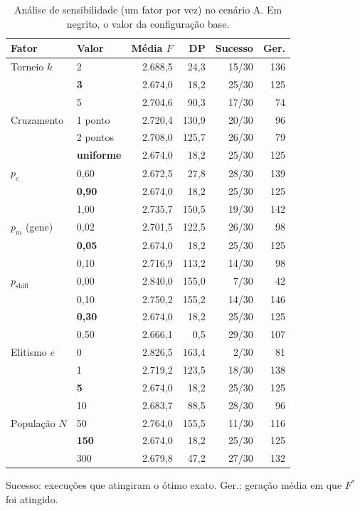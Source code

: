 \begin{table}[!t]
\centering
\footnotesize
\setlength{\tabcolsep}{4pt}
\caption{Análise de sensibilidade (um fator por vez) no cenário A. Em negrito, o valor da configuração base.}
\label{tab:a1_sens}
\begin{tabular}{@{}llrrrr@{}}
\toprule
Fator & Valor & Média $F$ & DP & Sucesso & Ger. \\
\midrule
Torneio $k$ & 2 & 2.688{,}5 & 24{,}3 & 15/30 & 136 \\
 & \textbf{3} & 2.674{,}0 & 18{,}2 & 25/30 & 125 \\
 & 5 & 2.704{,}6 & 90{,}3 & 17/30 & 74 \\
\midrule
Cruzamento & 1 ponto & 2.720{,}4 & 130{,}9 & 20/30 & 96 \\
 & 2 pontos & 2.708{,}0 & 125{,}7 & 26/30 & 79 \\
 & \textbf{uniforme} & 2.674{,}0 & 18{,}2 & 25/30 & 125 \\
\midrule
$p_c$ & 0{,}60 & 2.672{,}5 & 27{,}8 & 28/30 & 139 \\
 & \textbf{0{,}90} & 2.674{,}0 & 18{,}2 & 25/30 & 125 \\
 & 1{,}00 & 2.735{,}7 & 150{,}5 & 19/30 & 142 \\
\midrule
$p_m$ (gene) & 0{,}02 & 2.701{,}5 & 122{,}5 & 26/30 & 98 \\
 & \textbf{0{,}05} & 2.674{,}0 & 18{,}2 & 25/30 & 125 \\
 & 0{,}10 & 2.716{,}9 & 113{,}2 & 14/30 & 98 \\
\midrule
$p_{\mathrm{shift}}$ & 0{,}00 & 2.840{,}0 & 155{,}0 & 7/30 & 42 \\
 & 0{,}10 & 2.750{,}2 & 155{,}2 & 14/30 & 146 \\
 & \textbf{0{,}30} & 2.674{,}0 & 18{,}2 & 25/30 & 125 \\
 & 0{,}50 & 2.666{,}1 & 0{,}5 & 29/30 & 107 \\
\midrule
Elitismo $e$ & 0 & 2.826{,}5 & 163{,}4 & 2/30 & 81 \\
 & 1 & 2.719{,}2 & 123{,}5 & 18/30 & 138 \\
 & \textbf{5} & 2.674{,}0 & 18{,}2 & 25/30 & 125 \\
 & 10 & 2.683{,}7 & 88{,}5 & 28/30 & 96 \\
\midrule
População $N$ & 50 & 2.764{,}0 & 155{,}5 & 11/30 & 116 \\
 & \textbf{150} & 2.674{,}0 & 18{,}2 & 25/30 & 125 \\
 & 300 & 2.679{,}8 & 47{,}2 & 27/30 & 132 \\
\bottomrule
\end{tabular}
\par\smallskip\parbox{0.95\linewidth}{\scriptsize Sucesso: execuções que atingiram o ótimo exato. Ger.: geração média em que $F^*$ foi atingido.}
\end{table}
